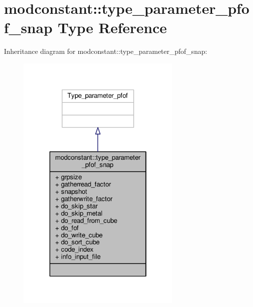 \hypertarget{structmodconstant_1_1type__parameter__pfof__snap}{}\section{modconstant\+:\+:type\+\_\+parameter\+\_\+pfof\+\_\+snap Type Reference}
\label{structmodconstant_1_1type__parameter__pfof__snap}


Inheritance diagram for modconstant\+:\+:type\+\_\+parameter\+\_\+pfof\+\_\+snap\+:\nopagebreak
\begin{figure}[H]
\begin{center}
\leavevmode
\includegraphics[width=226pt]{structmodconstant_1_1type__parameter__pfof__snap__inherit__graph}
\end{center}
\end{figure}


